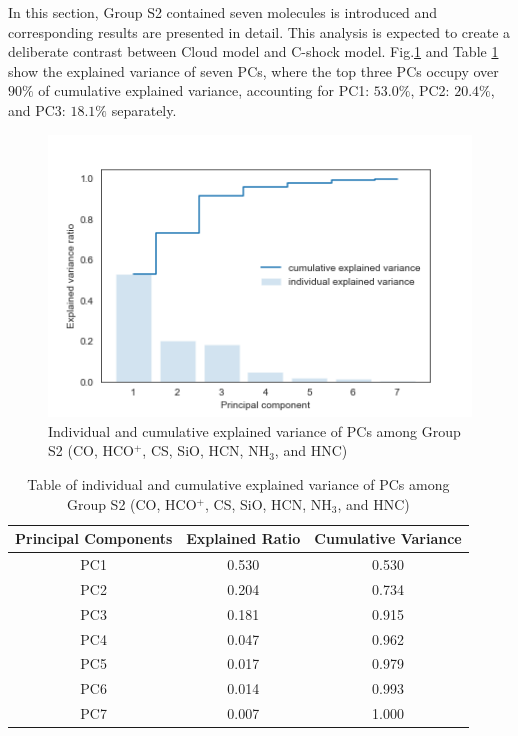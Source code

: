 \documentclass{aa}
\begin{document}
\begin{CJK*}{UTF8}{gbsn}
    In this section, Group S2 contained seven molecules is introduced and corresponding results are presented in detail. 
    This analysis is expected to create a deliberate contrast between Cloud model and C-shock model. 
    Fig.\ref{Fig-shock-2-varianve} and Table \ref{table-shock-2-1} show the explained variance of seven PCs, where the top three PCs occupy over $90\%$ of cumulative explained variance, accounting for PC1: $53.0\%$, PC2: $20.4\%$, and PC3: $18.1\%$ separately. 
 
    \begin{figure}[htp]
       \centering
       \captionsetup{justification=centering}
       \includegraphics[angle=0,scale =0.6]{shock-2/explained_variance_ratio.png}
       \caption{Individual and cumulative explained variance of PCs among Group S2 (CO, HCO$^+$, CS, SiO, HCN, NH$_3$, and HNC)}
        \label{Fig-shock-2-varianve}
    \end{figure}
   
    \begin{table}[htp]
        \centering
        \begin{tabular}{ccc}
        \hline\hline
        \multicolumn{1}{l}{Principal Components} & \multicolumn{1}{l}{Explained Ratio} & Cumulative Variance \\ \hline
                PC1 & 0.530  & 0.530\\ 
                PC2 & 0.204  & 0.734\\
                PC3 & 0.181  & 0.915\\
                PC4 & 0.047  & 0.962\\ 
                PC5 & 0.017  & 0.979\\
                PC6 & 0.014  & 0.993\\
                PC7 & 0.007  & 1.000\\\hline\hline
        \end{tabular}
        \caption{Table of individual and cumulative explained variance of PCs among Group S2 (CO, HCO$^+$, CS, SiO, HCN, NH$_3$, and HNC)}
        \label{table-shock-2-1}
    \end{table}


\end{CJK*}
\end{document}
